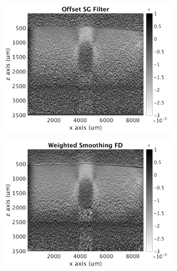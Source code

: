 \begin{figure}[h]
\begin{subfigure}{0.49\textwidth}
    \end{subfigure}
    \\
    \begin{subfigure}{0.49\textwidth}
    	\centering
        \includegraphics[width=\textwidth]{appendix_figs/posg_fr40_lr0.png}
    \end{subfigure}
    \begin{subfigure}{0.49\textwidth}
    	\centering
        \includegraphics[width=\textwidth]{appendix_figs/wfd_fr40_lr0.png}
    \end{subfigure}
    \\
    \begin{subfigure}{0.49\textwidth}
    	\centering

\end{subfigure}
\end{figure}
